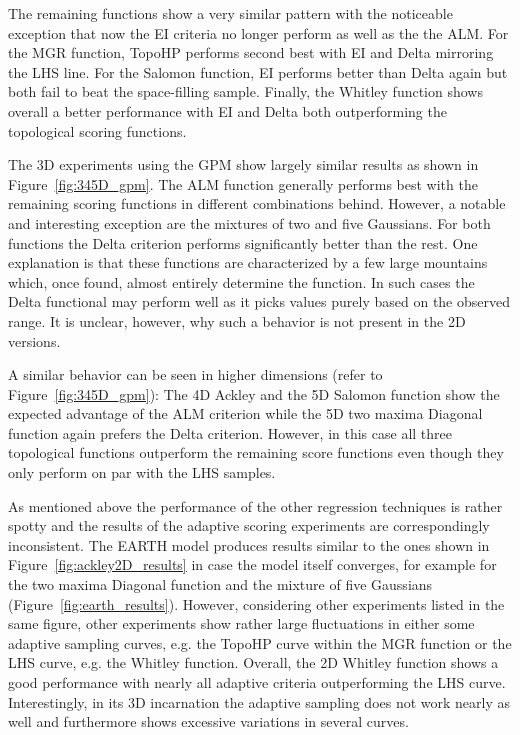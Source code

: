 The remaining functions show a very similar pattern with the noticeable exception that now the EI criteria no longer perform as well as the the ALM.
%
For the MGR function, TopoHP performs second best with EI and Delta mirroring the LHS line.
%
For the Salomon function, EI performs better than Delta again but both fail to beat the space-filling sample.
%
Finally, the Whitley function shows overall a better performance with EI and Delta both outperforming the topological scoring functions.

The 3D experiments using the GPM show largely similar results as shown in
Figure~\ref{fig:345D_gpm}.
%
The ALM function generally performs best with the remaining scoring functions in different combinations behind.
%
However, a notable and interesting exception are the mixtures of two and five Gaussians.
%
For both functions the Delta criterion performs significantly better than the rest.
%
One explanation is that these functions are characterized by a few large mountains
which, once found, almost entirely determine the function.
%
In such cases the Delta functional may perform well as it picks values purely based on the observed range.
%
It is unclear, however, why such a behavior is not present in the 2D versions.

A similar behavior can be seen in higher dimensions (refer to Figure~\ref{fig:345D_gpm}): The 4D Ackley and the 5D Salomon function show the expected advantage of the ALM criterion while the 5D two maxima Diagonal
function again prefers the Delta criterion.
%
However, in this case all three topological functions outperform the remaining score functions even though they only perform on par with the LHS samples.

As mentioned above the performance of the other regression techniques is rather spotty and the results of the adaptive scoring experiments are correspondingly inconsistent.
%
The EARTH model produces results similar to the ones shown in Figure~\ref{fig:ackley2D_results} in case the model itself converges, for example for the two maxima Diagonal function and the mixture of five Gaussians (Figure~\ref{fig:earth_results}).
%
However, considering other experiments listed in the same figure, other experiments show rather large fluctuations in either some adaptive sampling curves, e.g. the TopoHP curve within the MGR function or the LHS curve, e.g. the Whitley function.
%
Overall, the 2D Whitley function shows a good performance with nearly all adaptive criteria outperforming the LHS curve.
%
Interestingly, in its 3D incarnation the adaptive sampling does not work nearly as well and furthermore shows excessive variations in several curves.


